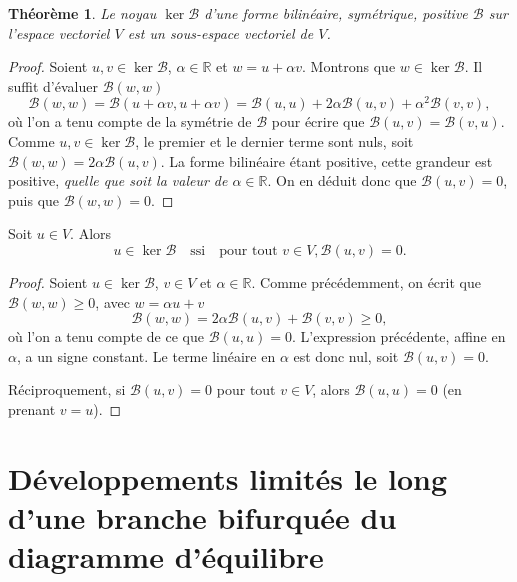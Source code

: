 \documentclass[12pt, final]{amsart}
\newtheorem{theorem}{Théorème}
\newcommand{\reals}{\mathbb{R}}
\begin{document}
\begin{theorem}
  Le noyau \(\ker\mathcal B\) d'une forme bilinéaire, symétrique, positive
  \(\mathcal B\) sur l'espace vectoriel \(V\) est un sous-espace vectoriel de
  \(V\).
\end{theorem}
\begin{proof}
  Soient \(u, v\in\ker\mathcal B\), \(\alpha\in\reals\) et \(w=u+\alpha
  v\). Montrons que \(w\in\ker\mathcal B\). Il suffit d'évaluer
  \(\mathcal B(w, w)\)
  \begin{equation}
    \mathcal B(w, w)=\mathcal B(u+\alpha v, u+\alpha v)=\mathcal B(u, u)+2\alpha\mathcal B(u, v)+\alpha^2\mathcal B(v, v),
  \end{equation}
  où l'on a tenu compte de la symétrie de \(\mathcal B\) pour écrire que
  \(\mathcal B(u, v)=\mathcal B(v, u)\). Comme \(u, v\in\ker\mathcal B\), le
  premier et le dernier terme sont nuls, soit
  \(\mathcal B(w, w)=2\alpha\mathcal B(u, v)\). La forme bilinéaire étant
  positive, cette grandeur est positive, \emph{quelle que soit la valeur de
    \(\alpha\in\reals\)}. On en déduit donc que \(\mathcal B(u, v)=0\), puis
  que \(\mathcal B(w, w)=0\).
\end{proof}

Soit \(u\in V\). Alors
\begin{equation}
  u\in\ker\mathcal B\quad\text{ssi}\quad\text{pour tout }v\in V, \mathcal B(u, v)=0.
\end{equation}
\begin{proof}
  Soient \(u\in\ker\mathcal B\), \(v\in V\) et \(\alpha\in\reals\). Comme
  précédemment, on écrit que \(\mathcal B(w, w)\geq0\), avec \(w=\alpha u+v\)
  \begin{equation}
    \mathcal B(w, w)=2\alpha\mathcal B(u, v)+\mathcal B(v, v)\geq0,
  \end{equation}
  où l'on a tenu compte de ce que \(\mathcal B(u, u)=0\). L'expression
  précédente, affine en \(\alpha\), a un signe constant. Le terme linéaire en
  \(\alpha\) est donc nul, soit \(\mathcal B(u, v)=0\).

  Réciproquement, si \(\mathcal B(u, v)=0\) pour tout \(v\in V\), alors
  \(\mathcal B(u, u)=0\) (en prenant \(v=u\)).
\end{proof}

\section{Développements limités le long d'une branche bifurquée du diagramme
  d'équilibre}
\end{document}
